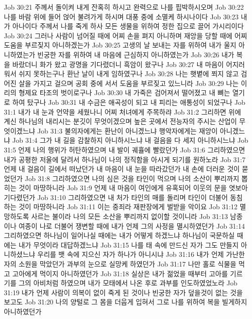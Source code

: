 Job 30:21  주께서 돌이켜 내게 잔혹히 하시고 완력으로 나를 핍박하시오며
Job 30:22  나를 바람 위에 들어 얹어 불려가게 하시며 대풍 중에 소멸케 하시나이다
Job 30:23  내가 아나이다 주께서 나를 죽게 하사 모든 생물을 위하여 정한 집으로 끌어 가시리이다
Job 30:24  그러나 사람이 넘어질 때에 어찌 손을 펴지 아니하며 재앙을 당할 때에 어찌 도움을 부르짖지 아니하겠는가
Job 30:25  고생의 날 보내는 자를 위하여 내가 울지 아니하였는가 빈궁한 자를 위하여 내 마음에 근심하지 아니하였는가
Job 30:26  내가 복을 바랐더니 화가 왔고 광명을 기다렸더니 흑암이 왔구나
Job 30:27  내 마음이 어지러워서 쉬지 못하는구나 환난 날이 내게 임하였구나
Job 30:28  나는 햇볕에 쬐지 않고 검어진 살을 가지고 걸으며 공회 중에 서서 도움을 부르짖고 있느니라
Job 30:29  나는 이리의 형제요 타조의 벗이로구나
Job 30:30  내 가죽은 검어져서 떨어졌고 내 뼈는 열기로 하여 탔구나
Job 30:31  내 수금은 애곡성이 되고 내 피리는 애통성이 되었구나
Job 31:1  내가 내 눈과 언약을 세웠나니 어찌 처녀에게 주목하랴
Job 31:2  그리하면 위에 계신 하나님의 내리시는 분깃이 무엇이겠으며 높은 곳에서 전능자의 주시는 산업이 무엇이겠느냐
Job 31:3  불의자에게는 환난이 아니겠느냐 행악자에게는 재앙이 아니겠느냐
Job 31:4  그가 내 길을 감찰하지 아니하시느냐 내 걸음을 다 세지 아니하시느냐
Job 31:5  언제 나의 행위가 허탄하였으며 내 발이 궤휼에 빨랐던가
Job 31:6  그리하였으면 내가 공평한 저울에 달려서 하나님이 나의 정직함을 아시게 되기를 원하노라
Job 31:7  언제 내 걸음이 길에서 떠났던가 내 마음이 내 눈을 따라갔던가 내 손에 더러운 것이 묻었던가
Job 31:8  그리하였으면 나의 심은 것을 타인이 먹으며 나의 소산이 뿌리까지 뽑히는 것이 마땅하니라
Job 31:9  언제 내 마음이 여인에게 유혹되어 이웃의 문을 엿보아 기다렸던가
Job 31:10  그리하였으면 내 처가 타인의 매를 돌리며 타인이 더불어 동침하는 것이 마땅하니라
Job 31:11  이는 중죄라 재판장에게 벌받을 악이요
Job 31:12  멸망하도록 사르는 불이라 나의 모든 소산을 뿌리까지 없이할 것이니라
Job 31:13  남종이나 여종이 나로 더불어 쟁변할 때에 내가 언제 그의 사정을 멸시하였던가
Job 31:14  그리하였으면 하나님이 일어나실 때에는 내가 어떻게 하겠느냐 하나님이 국문하실 때에는 내가 무엇이라 대답하겠느냐
Job 31:15  나를 태 속에 만드신 자가 그도 만들지 아니하셨느냐 우리를 뱃 속에 지으신 자가 하나가 아니시냐
Job 31:16  내가 언제 가난한 자의 소원을 막았던가 과부의 눈으로 실망케 하였던가
Job 31:17  나만 홀로 식물을 먹고 고아에게 먹이지 아니하였던가
Job 31:18  실상은 내가 젊었을 때부터 고아를 기르기를 그의 아비처럼 하였으며 내가 모태에서 나온 후로 과부를 인도하였었노라
Job 31:19  내가 언제 사람이 의복이 없이 죽게 된 것이나 빈궁한 자가 덮을것이 없는 것을 보고도
Job 31:20  나의 양털로 그 몸을 더웁게 입혀서 그로 나를 위하여 복을 빌게하지 아니하였던가
